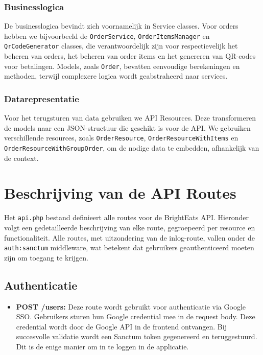 \subsubsection{Businesslogica}

De businesslogica bevindt zich voornamelijk in Service classes. Voor orders hebben we bijvoorbeeld de \texttt{OrderService}, \texttt{OrderItemsManager} en \texttt{QrCodeGenerator} classes, die verantwoordelijk zijn voor respectievelijk het beheren van orders, het beheren van order items en het genereren van QR-codes voor betalingen. Models, zoals \texttt{Order}, bevatten eenvoudige berekeningen en methoden, terwijl complexere logica wordt geabstraheerd naar services.

\subsubsection{Datarepresentatie}

Voor het terugsturen van data gebruiken we API Resources. Deze transformeren de models naar een JSON-structuur die geschikt is voor de API. We gebruiken verschillende resources, zoals \texttt{OrderResource}, \texttt{OrderResourceWithItems} en \texttt{OrderResourceWithGroupOrder}, om de nodige data te embedden, afhankelijk van de context.

\section{Beschrijving van de API Routes}

Het \texttt{api.php} bestand definieert alle routes voor de BrightEats API. Hieronder volgt een gedetailleerde beschrijving van elke route, gegroepeerd per resource en functionaliteit. Alle routes, met uitzondering van de inlog-route, vallen onder de \texttt{auth:sanctum} middleware, wat betekent dat gebruikers geauthenticeerd moeten zijn om toegang te krijgen.

\subsection{Authenticatie}

\begin{itemize}
  \item \textbf{POST /users:} Deze route wordt gebruikt voor authenticatie via Google SSO. Gebruikers sturen hun Google credential mee in de request body. Deze credential wordt door de Google API in de frontend ontvangen. Bij succesvolle validatie wordt een Sanctum token gegenereerd en teruggestuurd. Dit is de enige manier om in te loggen in de applicatie.
\end{itemize}

